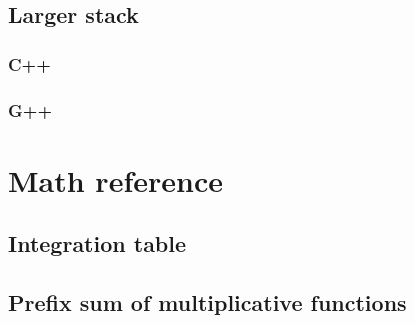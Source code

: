 \documentclass[a4paper]{report}
\begin{document}
			\subsection{Larger stack}
				\subsubsection{C++}
					
				\subsubsection{G++}
					
		\section{Math reference}
			\subsection{Integration table}
				
			\subsection{Prefix sum of multiplicative functions}
				
\end{document}
